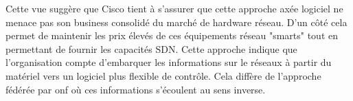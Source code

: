 


Cette vue suggère que Cisco tient à s'assurer que cette approche axée logiciel ne menace pas son business consolidé du marché de hardware réseau. D'un côté cela permet de maintenir les prix élevés de ces équipements réseau "smarts" tout en permettant de fournir les capacités SDN. Cette approche indique que l'organisation compte d'embarquer les informations sur le réseaux à partir du matériel vers un logiciel plus flexible de contrôle. Cela diffère de l'approche fédérée par \gls{onf} où ces informations s'écoulent au sens inverse. 



